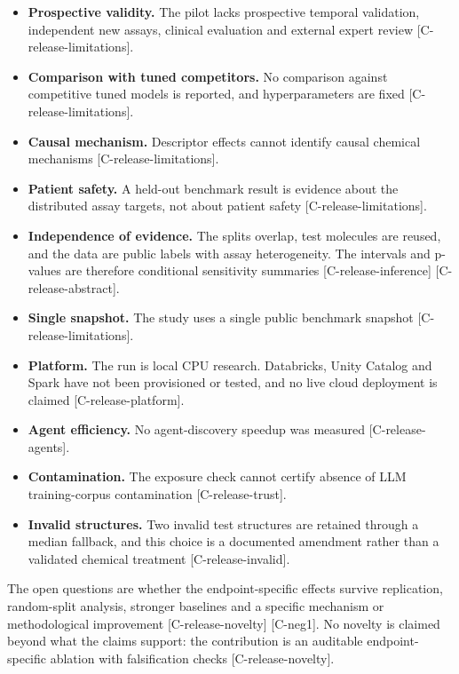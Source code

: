 \documentclass[10pt,twocolumn]{article}
\begin{document}
\begin{itemize}
\item \textbf{Prospective validity.} The pilot lacks prospective temporal validation, independent new assays, clinical evaluation and external expert review {\scriptsize[C-release-limitations]}.
\item \textbf{Comparison with tuned competitors.} No comparison against competitive tuned models is reported, and hyperparameters are fixed {\scriptsize[C-release-limitations]}.
\item \textbf{Causal mechanism.} Descriptor effects cannot identify causal chemical mechanisms {\scriptsize[C-release-limitations]}.
\item \textbf{Patient safety.} A held-out benchmark result is evidence about the distributed assay targets, not about patient safety {\scriptsize[C-release-limitations]}.
\item \textbf{Independence of evidence.} The splits overlap, test molecules are reused, and the data are public labels with assay heterogeneity. The intervals and p-values are therefore conditional sensitivity summaries {\scriptsize[C-release-inference]} {\scriptsize[C-release-abstract]}.
\item \textbf{Single snapshot.} The study uses a single public benchmark snapshot {\scriptsize[C-release-limitations]}.
\item \textbf{Platform.} The run is local CPU research. Databricks, Unity Catalog and Spark have not been provisioned or tested, and no live cloud deployment is claimed {\scriptsize[C-release-platform]}.
\item \textbf{Agent efficiency.} No agent-discovery speedup was measured {\scriptsize[C-release-agents]}.
\item \textbf{Contamination.} The exposure check cannot certify absence of LLM training-corpus contamination {\scriptsize[C-release-trust]}.
\item \textbf{Invalid structures.} Two invalid test structures are retained through a median fallback, and this choice is a documented amendment rather than a validated chemical treatment {\scriptsize[C-release-invalid]}.
\end{itemize}

The open questions are whether the endpoint-specific effects survive replication, random-split analysis, stronger baselines and a specific mechanism or methodological improvement {\scriptsize[C-release-novelty]} {\scriptsize[C-neg1]}. No novelty is claimed beyond what the claims support: the contribution is an auditable endpoint-specific ablation with falsification checks {\scriptsize[C-release-novelty]}.
\end{document}
